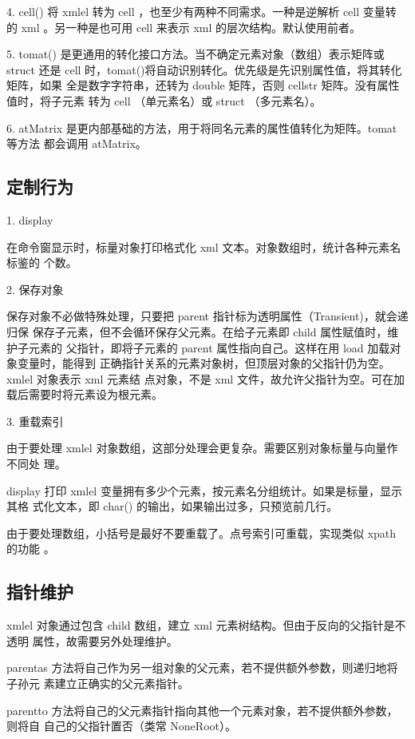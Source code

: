 4. cell() 将 xmlel 转为 cell ，也至少有两种不同需求。一种是逆解析 cell 变量转
的 xml 。另一种是也可用 cell 来表示 xml 的层次结构。默认使用前者。

5. tomat() 是更通用的转化接口方法。当不确定元素对象（数组）表示矩阵或 struct
还是 cell 时，tomat()将自动识别转化。优先级是先识别属性值，将其转化矩阵，如果
全是数字字符串，还转为 double 矩阵，否则 cellstr 矩阵。没有属性值时，将子元素
转为 cell （单元素名）或 struct （多元素名）。

6. atMatrix 是更内部基础的方法，用于将同名元素的属性值转化为矩阵。tomat 等方法
都会调用 atMatrix。

\subsection{定制行为}

1. display

在命令窗显示时，标量对象打印格式化 xml 文本。对象数组时，统计各种元素名标鉴的
个数。

2. 保存对象

保存对象不必做特殊处理，只要把 parent 指针标为透明属性（Transient)，就会递归保
保存子元素，但不会循环保存父元素。在给子元素即 child 属性赋值时，维护子元素的
父指针，即将子元素的 parent 属性指向自己。这样在用 load 加载对象变量时，能得到
正确指针关系的元素对象树，但顶层对象的父指针仍为空。xmlel 对象表示 xml 元素结
点对象，不是 xml 文件，故允许父指针为空。可在加载后需要时将元素设为根元素。

3. 重载索引

由于要处理 xmlel 对象数组，这部分处理会更复杂。需要区别对象标量与向量作不同处
理。

display 打印 xmlel 变量拥有多少个元素，按元素名分组统计。如果是标量，显示其格
式化文本，即 char() 的输出，如果输出过多，只预览前几行。

由于要处理数组，小括号是最好不要重载了。点号索引可重载，实现类似 xpath 的功能
。

\subsection{指针维护}

xmlel 对象通过包含 child 数组，建立 xml 元素树结构。但由于反向的父指针是不透明
属性，故需要另外处理维护。

parentas 方法将自己作为另一组对象的父元素，若不提供额外参数，则递归地将子孙元
素建立正确实的父元素指针。

parentto 方法将自己的父元素指针指向其他一个元素对象，若不提供额外参数，则将自
自己的父指针置否（类常 NoneRoot）。

